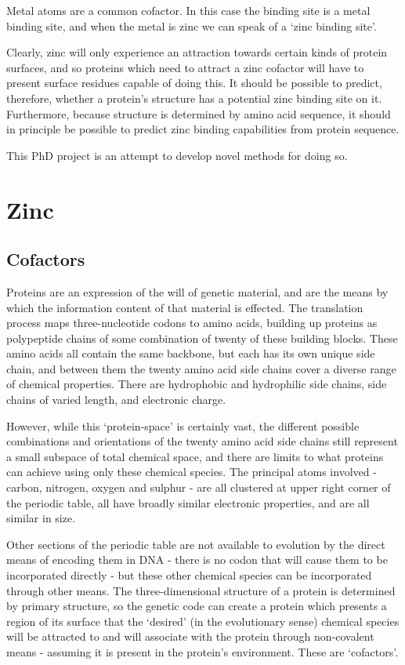 Metal atoms are a common cofactor. In this case the binding site is a metal binding site, and when the metal is zinc we can speak of a `zinc binding site'.

Clearly, zinc will only experience an attraction towards certain kinds of protein surfaces, and so proteins which need to attract a zinc cofactor will have to present surface residues capable of doing this. It should be possible to predict, therefore, whether a protein's structure has a potential zinc binding site on it. Furthermore, because structure is determined by amino acid sequence, it should in principle be possible to predict zinc binding capabilities from protein sequence.

This PhD project is an attempt to develop novel methods for doing so.

\section{Zinc}

\subsection{Cofactors}

Proteins are an expression of the will of genetic material, and are the means by which the information content of that material is effected. The translation process maps three-nucleotide codons to amino acids, building up proteins as polypeptide chains of some combination of twenty of these building blocks. These amino acids all contain the same backbone, but each has its own unique side chain, and between them the twenty amino acid side chains cover a diverse range of chemical properties. There are hydrophobic and hydrophilic side chains, side chains of varied length, and electronic charge.

However, while this `protein-space' is certainly vast, the different possible combinations and orientations of the twenty amino acid side chains still represent a small subspace of total chemical space, and there are limits to what proteins can achieve using only these chemical species. The principal atoms involved - carbon, nitrogen, oxygen and sulphur - are all clustered at upper right corner of the periodic table, all have broadly similar electronic properties, and are all similar in size.

Other sections of the periodic table are not available to evolution by the direct means of encoding them in DNA - there is no codon that will cause them to be incorporated directly - but these other chemical species can be incorporated through other means. The three-dimensional structure of a protein is determined by primary structure, so the genetic code can create a protein which presents a region of its surface that the `desired' (in the evolutionary sense) chemical species will be attracted to and will associate with the protein through non-covalent means - assuming it is present in the protein's environment. These are `cofactors'.

